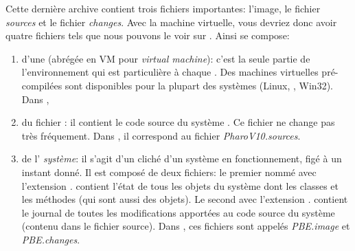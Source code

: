 \documentclass[a4paper,10pt,twoside]{book}
\begin{document}

Cette dernière archive contient trois fichiers importantes: l'image, le fichier \emph{sources} et le fichier \emph{changes}. Avec la machine virtuelle, vous devriez donc avoir quatre fichiers tels que nous pouvons le voir sur . Ainsi \pharo{} se compose:

\begin{enumerate}
\item d'une  (abrégée en VM pour
  \emph{virtual machine}): c'est la seule partie de l'environnement qui
  est particulière à chaque . Des machines virtuelles pré-compilées sont disponibles pour la plupart des
  systèmes (Linux, \macosx, Win32). Dans ,  %

  \item du fichier : il contient le code source du système
    \pharo. Ce fichier ne change pas très fréquement. Dans , il
    correspond au fichier
    \emph{PharoV10.sources}.

\item de l' \emph{système}: il s'agit d'un cliché d'un système
  \pharo{} en fonctionnement, figé à un instant donné. 
Il est composé de deux fichiers: le premier nommé avec l'extension
\emph{.} contient l'état de tous les objets du système
dont les classes et les méthodes (qui sont aussi des objets). 
Le second avec l'extension \emph{.} contient
le journal de toutes les modifications apportées au code source du
système (contenu dans le fichier source).
Dans , ces fichiers sont appelés
  \emph{PBE.image} et \emph{PBE.changes}.
\end{enumerate}
\end{document}
